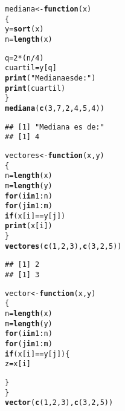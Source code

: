 \documentclass{article}\usepackage[]{graphicx}\usepackage[]{color}
\makeatletter
\newcommand{\hlnum}[1]{\textcolor[rgb]{0.686,0.059,0.569}{#1}}%
\newcommand{\hlstr}[1]{\textcolor[rgb]{0.192,0.494,0.8}{#1}}%
\newcommand{\hlopt}[1]{\textcolor[rgb]{0,0,0}{#1}}%
\newcommand{\hlstd}[1]{\textcolor[rgb]{0.345,0.345,0.345}{#1}}%
\newcommand{\hlkwa}[1]{\textcolor[rgb]{0.161,0.373,0.58}{\textbf{#1}}}%
\newcommand{\hlkwb}[1]{\textcolor[rgb]{0.69,0.353,0.396}{#1}}%
\newcommand{\hlkwc}[1]{\textcolor[rgb]{0.333,0.667,0.333}{#1}}%
\newcommand{\hlkwd}[1]{\textcolor[rgb]{0.737,0.353,0.396}{\textbf{#1}}}%
\newenvironment{kframe}{%
 \def\at@end@of@kframe{}%
 \ifinner\ifhmode%
  \def\at@end@of@kframe{\end{minipage}}%
  \begin{minipage}{\columnwidth}%
 \fi\fi%
 \def\FrameCommand##1{\hskip\@totalleftmargin \hskip-\fboxsep
 \colorbox{shadecolor}{##1}\hskip-\fboxsep
     \hskip-\linewidth \hskip-\@totalleftmargin \hskip\columnwidth}%
 \MakeFramed {\advance\hsize-\width
   \@totalleftmargin\z@ \linewidth\hsize
   \@setminipage}}%
 {\par\unskip\endMakeFramed%
 \at@end@of@kframe}
\newenvironment{knitrout}{}{} %
\makeatother
\begin{document}
\begin{knitrout}
\color{fgcolor}\begin{kframe}
\begin{alltt}
\hlstd{mediana}\hlkwb{<-} \hlkwa{function}\hlstd{(}\hlkwc{x}\hlstd{)}
\hlstd{\{}
  \hlstd{y}\hlkwb{=}\hlkwd{sort}\hlstd{(x)}
    \hlstd{n}\hlkwb{=}\hlkwd{length}\hlstd{(x)}


    \hlstd{q}\hlkwb{=}\hlnum{2}\hlopt{*}\hlstd{(n}\hlopt{/}\hlnum{4}\hlstd{)}
    \hlstd{cuartil}\hlkwb{=}\hlstd{y[q]}
    \hlkwd{print}\hlstd{(}\hlstr{"Mediana es de:"}\hlstd{)}
    \hlkwd{print}\hlstd{(cuartil)}
       \hlstd{\}}
\hlkwd{mediana}\hlstd{(}\hlkwd{c}\hlstd{(}\hlnum{3}\hlstd{,}\hlnum{7}\hlstd{,}\hlnum{2}\hlstd{,}\hlnum{4}\hlstd{,}\hlnum{5}\hlstd{,}\hlnum{4}\hlstd{))}
\end{alltt}
\begin{verbatim}
## [1] "Mediana es de:"
## [1] 4
\end{verbatim}
\end{kframe}
\end{knitrout}

\begin{knitrout}
\color{fgcolor}\begin{kframe}
\begin{alltt}
\hlstd{vectores}\hlkwb{<-} \hlkwa{function}\hlstd{(}\hlkwc{x}\hlstd{,}\hlkwc{y}\hlstd{)}
\hlstd{\{}
     \hlstd{n}\hlkwb{=}\hlkwd{length}\hlstd{(x)}
     \hlstd{m}\hlkwb{=}\hlkwd{length}\hlstd{(y)}
\hlkwa{for} \hlstd{(i} \hlkwa{in} \hlnum{1}\hlopt{:}\hlstd{n)}
  \hlkwa{for} \hlstd{(j} \hlkwa{in} \hlnum{1}\hlopt{:}\hlstd{m)}
    \hlkwa{if} \hlstd{(x[i]} \hlopt{==} \hlstd{y[j])}
        \hlkwd{print}\hlstd{(x[i])}
       \hlstd{\}}
\hlkwd{vectores}\hlstd{(}\hlkwd{c}\hlstd{(}\hlnum{1}\hlstd{,}\hlnum{2}\hlstd{,}\hlnum{3}\hlstd{),}\hlkwd{c}\hlstd{(}\hlnum{3}\hlstd{,}\hlnum{2}\hlstd{,}\hlnum{5}\hlstd{))}
\end{alltt}
\begin{verbatim}
## [1] 2
## [1] 3
\end{verbatim}
\end{kframe}
\end{knitrout}
\begin{knitrout}
\color{fgcolor}\begin{kframe}
\begin{alltt}
\hlstd{vector}\hlkwb{<-} \hlkwa{function}\hlstd{(}\hlkwc{x}\hlstd{,}\hlkwc{y}\hlstd{)}
\hlstd{\{}
     \hlstd{n}\hlkwb{=}\hlkwd{length}\hlstd{(x)}
     \hlstd{m}\hlkwb{=}\hlkwd{length}\hlstd{(y)}
\hlkwa{for} \hlstd{(i} \hlkwa{in} \hlnum{1}\hlopt{:}\hlstd{n)}
  \hlkwa{for} \hlstd{(j} \hlkwa{in} \hlnum{1}\hlopt{:}\hlstd{m)}
    \hlkwa{if} \hlstd{(x[i]} \hlopt{==} \hlstd{y[j])\{}
      \hlstd{z}\hlkwb{=}\hlstd{x[i]}

                \hlstd{\}}
\hlstd{\}}
\hlkwd{vector}\hlstd{(}\hlkwd{c}\hlstd{(}\hlnum{1}\hlstd{,}\hlnum{2}\hlstd{,}\hlnum{3}\hlstd{),}\hlkwd{c}\hlstd{(}\hlnum{3}\hlstd{,}\hlnum{2}\hlstd{,}\hlnum{5}\hlstd{))}
\end{alltt}
\end{kframe}
\end{knitrout}
\end{document}
